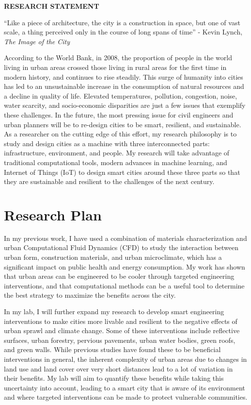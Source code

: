 \documentclass[12pt]{article}
\begin{document}
 \sloppy %

\begin{center}
{\large \uppercase{\textbf{Research Statement}}}
\end{center}

``Like a piece of architecture, the city is a construction in space, but one of vast scale, a thing perceived only in the course of long spans of time'' - Kevin Lynch, \textit{The Image of the City }

According to the World Bank, in 2008, the proportion of people in the world living in urban areas crossed those living in rural areas for the first time in modern history, and continues to rise steadily. This surge of humanity into cities has led to an unsustainable increase in the consumption of natural resources and a decline in quality of life. Elevated temperatures, pollution, congestion, noise, water scarcity, and socio-economic disparities are just a few issues that exemplify these challenges. In the future, the most pressing issue for civil engineers and urban planners will be to re-design cities to be smart, resilient, and sustainable. As a researcher on the cutting edge of this effort, my research philosophy is to study and design cities as a machine with three interconnected parts: infrastructure, environment, and people. My research will take advantage of traditional computational tools, modern advances in machine learning, and Internet of Things (IoT) to design smart cities around these three parts so that they are sustainable and resilient to the challenges of the next century.

\section*{Research Plan}
In my previous work, I have used a combination of materials characterization and urban Computational Fluid Dynamics (CFD) to study the interaction between urban form, construction materials, and urban microclimate, which has a significant impact on public health and energy consumption. My work has shown that urban areas can be engineered to be cooler through targeted engineering interventions, and that computational methods can be a useful tool to determine the best strategy to maximize the benefits across the city. 

In my lab, I will further expand my research to develop smart engineering interventions to make cities more livable and resilient to the negative effects of urban sprawl and climate change. Some of these interventions include reflective surfaces, urban forestry, pervious pavements, urban water bodies, green roofs, and green walls. While previous studies have found these to be beneficial interventions in general, the inherent complexity of urban areas due to changes in land use and land cover over very short distances lead to a lot of variation in their benefits. My lab will aim to quantify these benefits while taking this uncertainty into account, leading to a smart city that is aware of its environment and where targeted interventions can be made to protect vulnerable communities.
\end{document}
